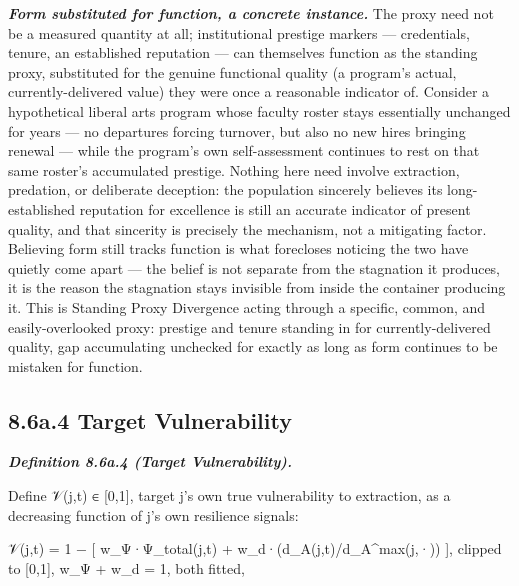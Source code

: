 \documentclass[
]{article}
\begin{document}
\emph{\textbf{Form substituted for function, a concrete instance.}} The
proxy need not be a measured quantity at all; institutional prestige
markers --- credentials, tenure, an established reputation --- can
themselves function as the standing proxy, substituted for the genuine
functional quality (a program's actual, currently-delivered value) they
were once a reasonable indicator of. Consider a hypothetical liberal
arts program whose faculty roster stays essentially unchanged for years
--- no departures forcing turnover, but also no new hires bringing
renewal --- while the program's own self-assessment continues to rest on
that same roster's accumulated prestige. Nothing here need involve
extraction, predation, or deliberate deception: the population sincerely
believes its long-established reputation for excellence is still an
accurate indicator of present quality, and that sincerity is precisely
the mechanism, not a mitigating factor. Believing form still tracks
function is what forecloses noticing the two have quietly come apart ---
the belief is not separate from the stagnation it produces, it is the
reason the stagnation stays invisible from inside the container
producing it. This is Standing Proxy Divergence acting through a
specific, common, and easily-overlooked proxy: prestige and tenure
standing in for currently-delivered quality, gap accumulating unchecked
for exactly as long as form continues to be mistaken for function.

\hypertarget{a.4-target-vulnerability}{%
\subsection{8.6a.4 Target
Vulnerability}\label{a.4-target-vulnerability}}

\emph{\textbf{Definition 8.6a.4 (Target Vulnerability).}}

Define 𝒱(j,t) ∈ {[}0,1{]}, target j's own true vulnerability to
extraction, as a decreasing function of j's own resilience signals:

𝒱(j,t) = 1 − {[} w\_Ψ·Ψ\_total(j,t) + w\_d·(d\_A(j,t)/d\_A\^{}max(j,·))
{]}, clipped to {[}0,1{]}, w\_Ψ + w\_d = 1, both fitted,
\end{document}
